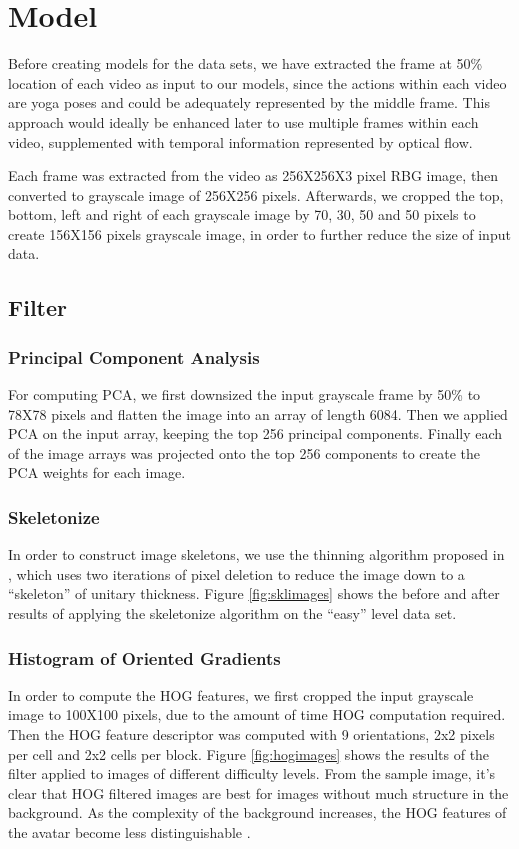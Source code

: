 \documentclass[
	a4paper, %
	10pt, %
	unnumberedsections, %
	twoside, %
]{t0004}
\begin{document}
\section{Model}

Before creating models for the data sets, we have extracted the frame at 50\% location of each video as input to our models, since the actions within each video are yoga poses and could be adequately represented by the middle frame. This approach would ideally be enhanced later to use multiple frames within each video, supplemented with temporal information represented by optical flow.

Each frame was extracted from the video as 256X256X3 pixel RBG image, then converted to grayscale image of 256X256 pixels. Afterwards, we cropped the top, bottom, left and right of each grayscale image by 70, 30, 50 and 50 pixels to create 156X156 pixels grayscale image, in order to further reduce the size of input data.

\subsection{Filter}

\subsubsection{Principal Component Analysis} For computing PCA, we first downsized the input grayscale frame by 50\% to 78X78 pixels and flatten the image into an array of length 6084. Then we applied PCA on the input array, keeping the top 256 principal components. Finally each of the image arrays was projected onto the top 256 components to create the PCA weights for each image.

\subsubsection{Skeletonize} In order to construct image skeletons, we use the thinning algorithm proposed in \cite{TYZhang:1984qr}, which uses two iterations of pixel deletion to reduce the image down to a ``skeleton'' of unitary thickness. Figure \ref{fig:sklimages} shows the before and after results of applying the skeletonize algorithm on the ``easy'' level data set.

\subsubsection{Histogram of Oriented Gradients} In order to compute the HOG features, we first cropped the input grayscale image to 100X100 pixels, due to the amount of time HOG computation required. Then the HOG feature descriptor was computed with 9 orientations, 2x2 pixels per cell and 2x2 cells per block. Figure \ref{fig:hogimages} shows the results of the filter applied to images of different difficulty levels. From the sample image, it's clear that HOG filtered images are best for images without much structure in the background. As the complexity of the background increases, the HOG features of the avatar become less distinguishable .
\end{document}
